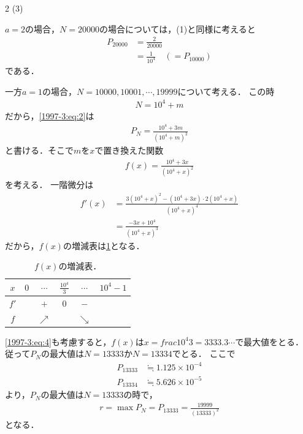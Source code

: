 \documentclass[../../../../main.tex]{subfiles}
\begin{document}
\begin{multicols}{2}
  \vspace{10pt}
  (3)

  $a=2$の場合，$N=20000$の場合については，(1)と同様に考えると
  \begin{align}
    P_{20000}
     & = \frac{2}{20000}                                       \\
     & = \frac{1}{10^4} \quad (=P_{10000}) \label{1997-3:eq:4}
  \end{align}
  である．

  一方$a=1$の場合，$N=10000,10001,\cdots,19999$について考える．
  この時
  \begin{align*}
    N = 10^4 + m
  \end{align*}
  だから，\cref{1997-3:eq:2}は
  \begin{align*}
    P_{N} = \frac{10^4+3m}{(10^4+m)^2}
  \end{align*}
  と書ける．そこで$m$を$x$で置き換えた関数
  \begin{align*}
    f(x) = \frac{10^4+3x}{(10^4+x)^2}
  \end{align*}
  を考える．
  一階微分は
  \begin{align*}
    f'(x) & = \frac{3(10^4+x)^2 - (10^4+3x) \cdot 2(10^4+x)}{(10^4+x)^4} \\
          & = \frac{-3x+10^4}{(10^4+x)^3}
  \end{align*}
  だから，$f(x)$の増減表は\cref{1997-3:table:1}となる．
  \begin{table}[H]
    \centering
    \caption{$f(x)$の増減表．}
    \label{1997-3:table:1}
    \begin{tabular}{|c||c|c|c|c|c|}
      \hline
      $x$  & $0$ & $\cdots$   & $\frac{10^4}{3}$ & $\cdots$   & $10^4-1$ \\
      \hline
      $f'$ &     & $+$        & $0$              & $-$        &          \\
      \hline
      $f$  &     & $\nearrow$ &                  & $\searrow$ &          \\
      \hline
    \end{tabular}
  \end{table}

  \cref{1997-3:eq:4}も考慮すると，$f(x)$は$x=frac{10^4}{3} = 3333.3\cdots$で最大値をとる．
  従って$P_N$の最大値は$N=13333$か$N=13334$でとる．
  ここで
  \begin{align*}
    P_{13333} & \fallingdotseq 1.125 \times 10^{-4} \\
    P_{13334} & \fallingdotseq 5.626 \times 10^{-5}
  \end{align*}
  より，$P_N$の最大値は$N=13333$の時で，
  \begin{align*}
    r = \max P_N = P_{13333} = \frac{19999}{(13333)^2}
  \end{align*}
  となる．


\end{multicols}
\end{document}
